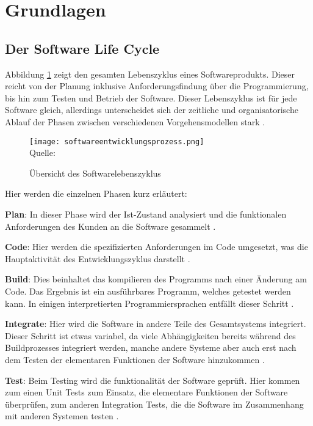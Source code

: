 \section{Grundlagen}

\subsection{Der Software Life Cycle}

Abbildung \ref{fig:softwareentwicklungsprozess} zeigt den gesamten Lebenszyklus eines Softwareprodukts. Dieser 
reicht von der Planung inklusive Anforderungsfindung über die Programmierung, bis
hin zum Testen und Betrieb der Software.
Dieser Lebenszyklus ist für jede Software gleich, allerdings unterscheidet sich der
zeitliche und organisatorische Ablauf der Phasen zwischen verschiedenen Vorgehensmodellen
stark \cite{DietmarAbts2017}.

\begin{figure}[H]
    \centering
    \caption{Übersicht des Softwarelebenszyklus}
	\label{fig:softwareentwicklungsprozess}
    \texttt{[image: softwareentwicklungsprozess.png]}
    \\
    Quelle: \cite{Halstenberg2020}
\end{figure}

Hier werden die einzelnen Phasen kurz erläutert:

\textbf{Plan}: In dieser Phase wird der Ist-Zustand analysiert und die funktionalen Anforderungen
des Kunden an die Software gesammelt \cite{Halstenberg2020}.

\textbf{Code}: Hier werden die spezifizierten Anforderungen im Code umgesetzt, was
die Hauptaktivität des Entwicklungszyklus darstellt \cite{Halstenberg2020}.

\textbf{Build}: Dies beinhaltet das kompilieren des Programms nach einer Änderung
am Code. Das Ergebnis ist ein ausführbares Programm, welches getestet werden kann.
In einigen interpretierten Programmiersprachen entfällt dieser Schritt \cite{Halstenberg2020}.

\textbf{Integrate}: Hier wird die Software in andere Teile des Gesamtsystems integriert.
Dieser Schritt ist etwas variabel, da viele Abhängigkeiten bereits während des Buildprozesses
integriert werden, manche andere Systeme aber auch erst nach dem Testen der elementaren
Funktionen der Software hinzukommen \cite{Halstenberg2020}.

\textbf{Test}: Beim Testing wird die funktionalität der Software geprüft.
Hier kommen zum einen Unit Tests zum Einsatz, die elementare Funktionen der Software überprüfen,
zum anderen Integration Tests, die die Software im Zusammenhang mit anderen Systemen testen \cite{Halstenberg2020}.

